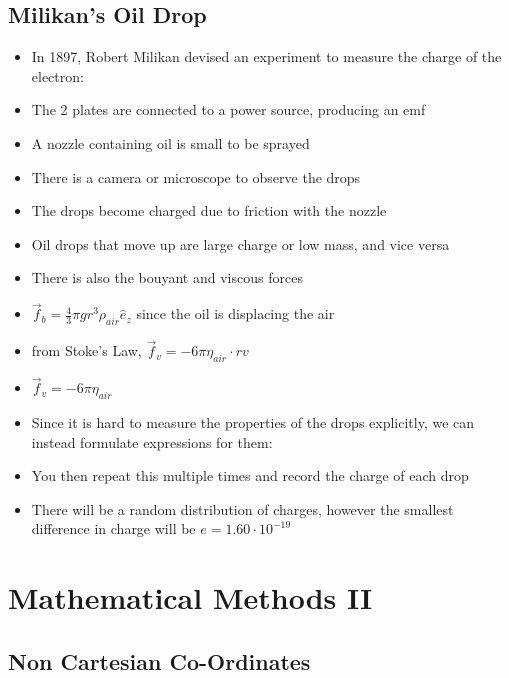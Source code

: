 \documentclass{article}
\begin{document}
\subsection{Milikan's Oil Drop}

\begin{itemize}
    \item In 1897, Robert Milikan devised an experiment to measure the charge of the electron:
    \item The 2 plates are connected to a power source, producing an emf
    \item A nozzle containing oil is small to be sprayed
    \item There is a camera or microscope to observe the drops
    \item The drops become charged due to friction with the nozzle
    \item Oil drops that move up are large charge or low mass, and vice versa
    \item There is also the bouyant and viscous forces
    \item \(\vec f_b = \frac{4}{3}\pi g r^3\rho_{air}\hat e_z\) since the oil is displacing the air
    \item from Stoke's Law, \(\vec f_v = -6\pi\eta_{air}\cdot rv\)
    \item \(\vec f_v=-6\pi\eta_{air}\)
    \item Since it is hard to measure the properties of the drops explicitly, we can instead formulate expressions for them:
    \item You then repeat this multiple times and record the charge of each drop
    \item There will be a random distribution of charges, however the smallest difference in charge will be \(e = 1.60\cdot 10^{-19}\)
\end{itemize}

\newpage
\section{Mathematical Methods II}
\subsection{Non Cartesian Co-Ordinates}
\end{document}

